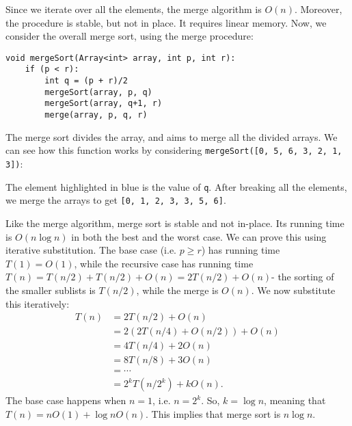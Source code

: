 \documentclass[a4paper, openany]{memoir}
\begin{document}
\noindent Since we iterate over all the elements, the merge algorithm is $O(n)$. Moreover, the procedure is stable, but not in place. It requires linear memory. Now, we consider the overall merge sort, using the merge procedure:
\begin{lstlisting}[language=pseudocode]
void mergeSort(Array<int> array, int p, int r):
    if (p < r):
        int q = (p + r)/2
        mergeSort(array, p, q)
        mergeSort(array, q+1, r)
        merge(array, p, q, r)
\end{lstlisting}
The merge sort divides the array, and aims to merge all the divided arrays. We can see how this function works by considering \texttt{mergeSort([0, 5, 6, 3, 2, 1, 3])}:
\begin{center}
\end{center}
The element highlighted in blue is the value of \texttt{q}. After breaking all the elements, we merge the arrays to get \texttt{[0, 1, 2, 3, 3, 5, 6]}.

\noindent Like the merge algorithm, merge sort is stable and not in-place. Its running time is $O(n \log n)$ in both the best and the worst case. We can prove this using iterative substitution. The base case (i.e. $p \geq r$) has running time $T(1) = O(1)$, while the recursive case has running time $T(n) = T(n/2) + T(n/2) + O(n) = 2T(n/2) + O(n)$- the sorting of the smaller sublists is $T(n/2)$, while the merge is $O(n)$. We now substitute this iteratively:
\begin{align*}
    T(n) &= 2T(n/2) + O(n) \\
    &= 2(2T(n/4) + O(n/2)) + O(n) \\
    &= 4T(n/4) + 2O(n) \\
    &= 8T(n/8) + 3O(n) \\
    &= \cdots \\
    &= 2^k T(n/2^k) + kO(n).
\end{align*}
The base case happens when $n = 1$, i.e. $n = 2^k$. So, $k = \log n$, meaning that $T(n) = nO(1) + \log n O(n)$. This implies that merge sort is $n \log n$.
\end{document}
